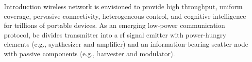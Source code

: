 \documentclass[journal]{IEEEtran}
\begin{document}
\glsresetall

\begin{section}{Introduction}
	 wireless network is envisioned to provide high throughput, uniform coverage, pervasive connectivity, heterogeneous control, and cognitive intelligence for trillions of portable devices.
	As an emerging low-power communication protocol, \gls{bc} divides transmitter into a \gls{rf} signal emitter with power-hungry elements (e.g., synthesizer and amplifier) and an information-bearing scatter node with passive components (e.g., harvester and modulator).

\end{section}
\end{document}
